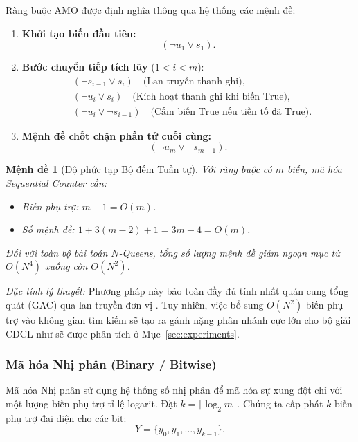 \documentclass[a4paper,fleqn]{cas-sc}
\newtheorem{proposition}{Mệnh đề}
\begin{document}
Ràng buộc AMO được định nghĩa thông qua hệ thống các mệnh đề:
\begin{enumerate}
    \item \textbf{Khởi tạo biến đầu tiên:}
    \begin{equation}
        (\neg u_1 \lor s_1).
    \end{equation}
    \item \textbf{Bước chuyển tiếp tích lũy} ($1 < i < m$):
    \begin{align}
        &(\neg s_{i-1} \lor s_i) \quad \text{(Lan truyền thanh ghi)},\\
        &(\neg u_i \lor s_i) \quad \text{(Kích hoạt thanh ghi khi biến True)},\\
        &(\neg u_i \lor \neg s_{i-1}) \quad \text{(Cấm biến True nếu tiền tố đã True)}.
    \end{align}
    \item \textbf{Mệnh đề chốt chặn phần tử cuối cùng:}
    \begin{equation}
        (\neg u_m \lor \neg s_{m-1}).
    \end{equation}
\end{enumerate}

\begin{proposition}[Độ phức tạp Bộ đếm Tuần tự]
Với ràng buộc có $m$ biến, mã hóa Sequential Counter cần:
\begin{itemize}
    \item Biến phụ trợ: $m - 1 = O(m)$.
    \item Số mệnh đề: $1 + 3(m - 2) + 1 = 3m - 4 = O(m)$.
\end{itemize}
Đối với toàn bộ bài toán $N$-Queens, tổng số lượng mệnh đề giảm ngoạn mục từ $O(N^4)$ xuống còn $O(N^2)$.
\end{proposition}

\textit{Đặc tính lý thuyết:} Phương pháp này bảo toàn đầy đủ tính nhất quán cung tổng quát (GAC) qua lan truyền đơn vị \cite{sinz2005towards}. Tuy nhiên, việc bổ sung $O(N^2)$ biến phụ trợ vào không gian tìm kiếm sẽ tạo ra gánh nặng phân nhánh cực lớn cho bộ giải CDCL như sẽ được phân tích ở Mục~\ref{sec:experiments}.

\subsubsection{Mã hóa Nhị phân (Binary / Bitwise)}
Mã hóa Nhị phân \cite{frisch2005atmost} sử dụng hệ thống số nhị phân để mã hóa sự xung đột chỉ với một lượng biến phụ trợ tỉ lệ logarit. Đặt $k = \lceil \log_2 m \rceil$. Chúng ta cấp phát $k$ biến phụ trợ đại diện cho các bit:
\begin{equation}
    Y = \{y_0, y_1, \dots, y_{k-1}\}.
\end{equation}
\end{document}
